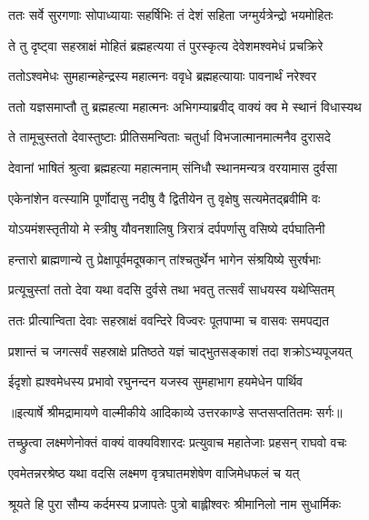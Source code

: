 \twolineshloka
{ततः सर्वे सुरगणाः सोपाध्यायाः सहर्षिभिः}
{तं देशं सहिता जग्मुर्यत्रेन्द्रो भयमोहितः} %

\twolineshloka
{ते तु दृष्ट्वा सहस्राक्षं मोहितं ब्रह्महत्यया}
{तं पुरस्कृत्य देवेशमश्वमेधं प्रचक्रिरे} %

\twolineshloka
{ततोऽश्वमेधः सुमहान्महेन्द्रस्य महात्मनः}
{ववृधे ब्रह्महत्यायाः पावनार्थं नरेश्वर} %

\twolineshloka
{ततो यज्ञसमाप्तौ तु ब्रह्महत्या महात्मनः}
{अभिगम्याब्रवीद् वाक्यं क्व मे स्थानं विधास्यथ} %

\twolineshloka
{ते तामूचुस्ततो देवास्तुष्टाः प्रीतिसमन्विताः}
{चतुर्धा विभजात्मानमात्मनैव दुरासदे} %

\twolineshloka
{देवानां भाषितं श्रुत्वा ब्रह्महत्या महात्मनाम्}
{संनिधौ स्थानमन्यत्र वरयामास दुर्वसा} %

\twolineshloka
{एकेनांशेन वत्स्यामि पूर्णोदासु नदीषु वै}
{द्वितीयेन तु वृक्षेषु सत्यमेतद्ब्रवीमि वः} %

\twolineshloka
{योऽयमंशस्तृतीयो मे स्त्रीषु यौवनशालिषु}
{त्रिरात्रं दर्पपर्णासु वसिष्ये दर्पघातिनी} %

\twolineshloka
{हन्तारो ब्राह्मणान्ये तु प्रेक्षापूर्वमदूषकान्}
{तांश्चतुर्थेन भागेन संश्रयिष्ये सुरर्षभाः} %

\twolineshloka
{प्रत्यूचुस्तां ततो देवा यथा वदसि दुर्वसे}
{तथा भवतु तत्सर्वं साधयस्व यथेप्सितम्} %

\twolineshloka
{ततः प्रीत्यान्विता देवाः सहस्राक्षं ववन्दिरे}
{विज्वरः पूतपाप्मा च वासवः समपद्यत} %

\twolineshloka
{प्रशान्तं च जगत्सर्वं सहस्राक्षे प्रतिष्ठते}
{यज्ञं चाद्भुतसङ्काशं तदा शक्रोऽभ्यपूजयत्} %

\twolineshloka
{ईदृशो ह्यश्वमेधस्य प्रभावो रघुनन्दन}
{यजस्व सुमहाभाग हयमेधेन पार्थिव} %


{॥इत्यार्षे श्रीमद्रामायणे वाल्मीकीये आदिकाव्ये उत्तरकाण्डे सप्तसप्ततितमः सर्गः॥}


\twolineshloka
{तच्छ्रुत्वा लक्ष्मणेनोक्तं वाक्यं वाक्यविशारदः}
{प्रत्युवाच महातेजाः प्रहसन् राघवो वचः} %

\twolineshloka
{एवमेतन्नरश्रेष्ठ यथा वदसि लक्ष्मण}
{वृत्रघातमशेषेण वाजिमेधफलं च यत्} %

\twolineshloka
{श्रूयते हि पुरा सौम्य कर्दमस्य प्रजापतेः}
{पुत्रो बाह्लीश्वरः श्रीमानिलो नाम सुधार्मिकः} %

